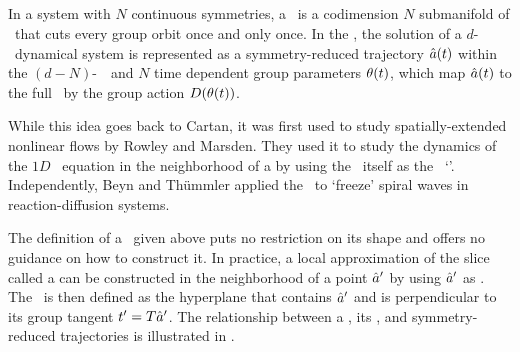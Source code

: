 
\subsection{\Mslices}
\label{s-slice}

In a system with $N$ continuous symmetries, a \emph{\slice} \pSRed\ is a codimension $N$ submanifold
of \pS\ that cuts every group orbit once and only once. In the \emph{\mslices}, the solution
of a $d$-\dmn\ dynamical system is represented as a symmetry-reduced trajectory $\hat{a} (t)$ within the
$(d-N)$-\dmn\ \slice\ and $N$ time dependent group parameters $\theta(t)$, which
map $\hat{a} (t)$ to the full \statesp\ by the group action ${D}(\theta(t))$.

While this idea goes back to Cartan,
it was first used to study spatially-extended nonlinear flows by Rowley and Marsden. 
They used it to study the dynamics of
the $1D$ \KS\ equation in the neighborhood of
a \reqv by using the \reqv\ itself as the \slice\ `\template'.
Independently, Beyn and Th\"{u}mmler applied
the \mslices\ to `freeze' spiral waves in reaction-diffusion systems.

The definition of a \slice\ given above puts no restriction on its shape
and offers no guidance on how to construct it. In practice, a
local approximation of the slice called a \emph{\slicePlane} can be constructed
in the neighborhood of a point ${\hat{a}'}$ by using ${\hat{a}'}$ as
\emph{\template}. The \slicePlane\ is then defined as the hyperplane that
contains ${\hat{a}'}$ and is perpendicular to its group tangent $t'_{}
= {T} {\hat{a}'}$. The relationship between a \template, its \slicePlane, and symmetry-reduced trajectories
is illustrated in .

